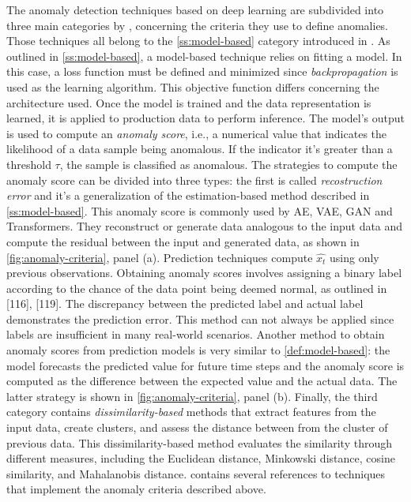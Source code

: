 The anomaly detection techniques based on deep learning are subdivided into three main categories by \cite{choi2021deep}, concerning the criteria they use to define anomalies. Those techniques all belong to the \autoref{ss:model-based} category introduced in \cite{blazquez2020review}. As outlined in \autoref{ss:model-based}, a model-based technique relies on fitting a model. In this case, a loss function must be defined and minimized since \textit{backpropagation} is used as the learning algorithm. This objective function differs concerning the architecture used. Once the model is trained and the data representation is learned, it is applied to production data to perform inference. The model's output is used to compute an \textit{anomaly score}, i.e., a numerical value that indicates the likelihood of a data sample being anomalous. If the indicator it's greater than a threshold $\tau$, the sample is classified as anomalous. The strategies to compute the anomaly score can be divided into three types: the first is called \textit{recostruction error} and it's a generalization of the estimation-based method described in \autoref{ss:model-based}. This anomaly score is commonly used by AE, VAE, GAN and Transformers. They reconstruct or generate data analogous to the input data and compute the residual between the input and generated data, as shown in \autoref{fig:anomaly-criteria}, panel (a). Prediction techniques compute $\hat{x_t}$ using only previous observations. Obtaining anomaly scores involves assigning a binary label according to the chance of the data point being deemed normal, as outlined in [116], [119]. The discrepancy between the predicted label and actual label demonstrates the prediction error. This method can not always be applied since labels are insufficient in many real-world scenarios. Another method to obtain anomaly scores from prediction models is very similar to \autoref{def:model-based}: the model forecasts the predicted value for future time steps and the anomaly score is computed as the difference between the expected value and the actual data. The latter strategy is shown in \autoref{fig:anomaly-criteria}, panel (b). Finally, the third category contains \textit{dissimilarity-based} methods that extract features from the input data, create clusters, and assess the distance between from the cluster of previous data. This dissimilarity-based method evaluates the similarity through different measures, including the Euclidean distance, Minkowski distance, cosine similarity, and Mahalanobis distance. \cite{choi2021deep} contains several references to techniques that implement the anomaly criteria described above. 

